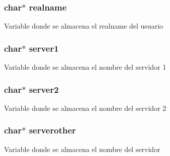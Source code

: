 \subsubsection[{\texorpdfstring{realname}{realname}}]{\setlength{\rightskip}{0pt plus 5cm}char$\ast$ realname}\hypertarget{_g-2361-06-_p1-_server_8c_a980ab011cd3d327b370c042833f1dc08}{}\label{_g-2361-06-_p1-_server_8c_a980ab011cd3d327b370c042833f1dc08}
Variable donde se almacena el realname del usuario 
\subsubsection[{\texorpdfstring{server1}{server1}}]{\setlength{\rightskip}{0pt plus 5cm}char$\ast$ server1}\hypertarget{_g-2361-06-_p1-_server_8c_a9045e9ee0087b60273244cd6c2f91a5f}{}\label{_g-2361-06-_p1-_server_8c_a9045e9ee0087b60273244cd6c2f91a5f}
Variable donde se almacena el nombre del servidor 1 
\subsubsection[{\texorpdfstring{server2}{server2}}]{\setlength{\rightskip}{0pt plus 5cm}char$\ast$ server2}\hypertarget{_g-2361-06-_p1-_server_8c_a70dd311bef3d0b4160a7ce0706f8f4cc}{}\label{_g-2361-06-_p1-_server_8c_a70dd311bef3d0b4160a7ce0706f8f4cc}
Variable donde se almacena el nombre del servidor 2 
\subsubsection[{\texorpdfstring{serverother}{serverother}}]{\setlength{\rightskip}{0pt plus 5cm}char$\ast$ serverother}\hypertarget{_g-2361-06-_p1-_server_8c_ae6eaaf28b08889a7ec2359f8968d796c}{}\label{_g-2361-06-_p1-_server_8c_ae6eaaf28b08889a7ec2359f8968d796c}
Variable donde se almacena el nombre del servidor 
